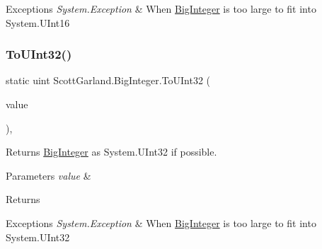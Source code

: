 \begin{DoxyExceptions}{Exceptions}
{\em System.\+Exception} & When \hyperlink{class_scott_garland_1_1_big_integer}{Big\+Integer} is too large to fit into System.\+U\+Int16\\
\hline
\end{DoxyExceptions}
\mbox{\label{class_scott_garland_1_1_big_integer_a89c18ca36b64bb368c7e96906a750537}} 
\subsubsection{\texorpdfstring{To\+U\+Int32()}{ToUInt32()}}
{\footnotesize\ttfamily static uint Scott\+Garland.\+Big\+Integer.\+To\+U\+Int32 (\begin{DoxyParamCaption}\item[{\hyperlink{class_scott_garland_1_1_big_integer}{Big\+Integer}}]{value }\end{DoxyParamCaption})\hspace{0.3cm}{\ttfamily [inline]}, {\ttfamily [static]}}



Returns \hyperlink{class_scott_garland_1_1_big_integer}{Big\+Integer} as System.\+U\+Int32 if possible. 


\begin{DoxyParams}{Parameters}
{\em value} & \\
\hline
\end{DoxyParams}
\begin{DoxyReturn}{Returns}

\end{DoxyReturn}

\begin{DoxyExceptions}{Exceptions}
{\em System.\+Exception} & When \hyperlink{class_scott_garland_1_1_big_integer}{Big\+Integer} is too large to fit into System.\+U\+Int32\\
\hline
\end{DoxyExceptions}
\mbox{\label{class_scott_garland_1_1_big_integer_a5b75b559d0c7ec75ff4eaceb1cdee2a4}} 
